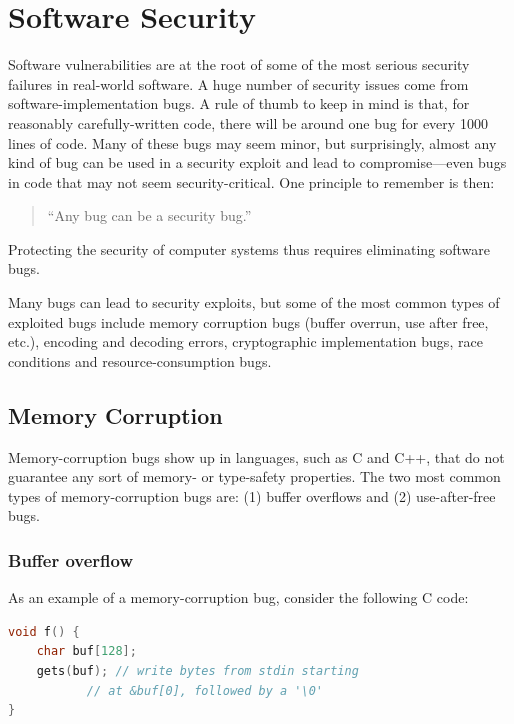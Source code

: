\chapter{Software Security}

Software vulnerabilities are at the root of 
some of the most serious security failures
in real-world software.
A huge number of security issues come from
software-implementation bugs.
A rule of thumb to keep in mind is that, for reasonably
carefully-written code, there will be around one
bug for every 1000 lines of code. Many of these
bugs may seem minor, but surprisingly, almost any
kind of bug can be used in a security exploit and
lead to compromise---even bugs in code that may
not seem security-critical. One principle to remember
is then:
\begin{quote}
``Any bug can be a security bug.''
\end{quote}
Protecting the security of computer systems thus requires
eliminating software bugs. 

Many bugs can lead to security exploits, but some
of the most common types of exploited bugs include
memory corruption bugs (buffer overrun, use after free, etc.), 
encoding and decoding errors,
cryptographic implementation bugs,
race conditions
and resource-consumption bugs.

\section{Memory Corruption}

Memory-corruption bugs show up in languages, such as C and C++, that
do not guarantee any sort of memory- or type-safety properties.
The two most common types of memory-corruption bugs 
are: (1) buffer overflows and (2) use-after-free bugs.

\subsection{Buffer overflow}
As an example of a memory-corruption bug, 
consider the following C code:

\begin{lstlisting}[language=c]
void f() {
	char buf[128];
	gets(buf); // write bytes from stdin starting
		   // at &buf[0], followed by a '\0'
}
\end{lstlisting}

